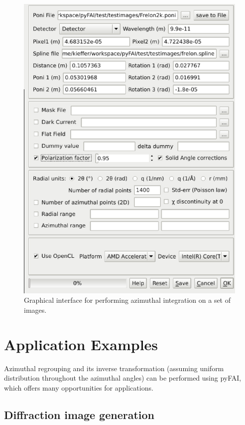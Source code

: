 \documentclass[preprint]{iucr}
\begin{document}
\begin{figure}
\label{pyFAI-integrate}
\begin{center}
\includegraphics[width=15cm]{integrate.eps}
\caption{Graphical interface for performing azimuthal integration on a set of
images.}
\end{center}
\end{figure}

\section{Application Examples}

Azimuthal regrouping and its inverse transformation (assuming
uniform distribution throughout the azimuthal angles) can be performed
using pyFAI, which offers many opportunities for applications.

\subsection{Diffraction image generation}
\end{document}
